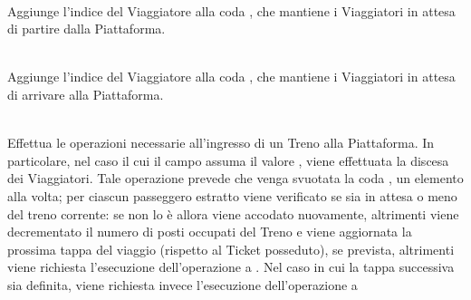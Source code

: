 \begin{description}
		\item {}\\
		Aggiunge l'indice del Viaggiatore  alla coda , che mantiene i Viaggiatori in attesa di partire dalla Piattaforma.
		
		\item {}\\
		Aggiunge l'indice del Viaggiatore  alla coda , che mantiene i Viaggiatori in attesa di arrivare alla Piattaforma.
		
		\item {}\\
		Effettua le operazioni necessarie all'ingresso di un Treno alla Piattaforma. In particolare, nel caso il cui il campo  assuma il valore , viene effettuata la discesa dei Viaggiatori. Tale operazione prevede che venga svuotata la coda , un elemento alla volta; per ciascun passeggero estratto viene verificato se sia in attesa o meno del treno corrente: se non lo è allora viene accodato nuovamente, altrimenti viene decrementato il numero di posti occupati del Treno e viene aggiornata la prossima tappa del viaggio (rispetto al Ticket posseduto), se prevista, altrimenti viene richiesta l'esecuzione dell'operazione  a . Nel caso in cui la tappa successiva sia definita, viene richiesta invece l'esecuzione dell'operazione  a 
		

\end{description}
